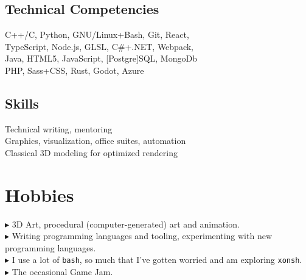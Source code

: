 \documentclass[Letterpaper,11pt]{article}
\newcommand{\bul}{$\blacktriangleright$ }
\begin{document}
\begin{multicols}{2}

    \subsection*{Technical Competencies}

        C++/C, Python, GNU/Linux+Bash, Git, React, \\
        TypeScript, Node.js, GLSL, C\#+.NET, Webpack, \\
        Java, HTML5, JavaScript, [Postgre]SQL, MongoDb \\ 
        PHP, Sass+CSS, Rust, Godot, Azure \\

    \subsection*{Skills}

        Technical writing, mentoring\\
        Graphics, visualization, office suites, automation\\
        Classical 3D modeling for optimized rendering

\end{multicols}

\section*{Hobbies}

    \bul 3D Art, procedural (computer-generated) art and animation.\\
    \bul Writing programming languages and tooling, experimenting with new programming languages.\\
    \bul I use a lot of \texttt{bash}, so much that I've gotten worried and am exploring \texttt{xonsh}.\\
    \bul The occasional Game Jam.

\clearpage
\end{document}
